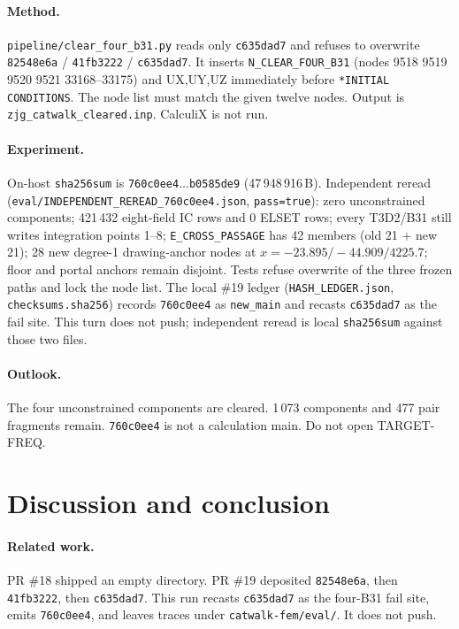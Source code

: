 \documentclass[11pt,a4paper]{article}
\begin{document}
\paragraph{Method.}
\texttt{pipeline/clear\_four\_b31.py} reads only \texttt{c635dad7} and
refuses to overwrite \texttt{82548e6a} / \texttt{41fb3222} /
\texttt{c635dad7}. It inserts \texttt{N\_CLEAR\_FOUR\_B31} (nodes 9518 9519
9520 9521 33168--33175) and UX,UY,UZ immediately before
\texttt{*INITIAL CONDITIONS}. The node list must match the given twelve
nodes. Output is \texttt{zjg\_catwalk\_cleared.inp}. CalculiX is not run.

\paragraph{Experiment.}
On-host \texttt{sha256sum} is
\texttt{760c0ee4\(\ldots\)b0585de9} (47\,948\,916\,B). Independent reread
(\texttt{eval/INDEPENDENT\_REREAD\_760c0ee4.json}, \texttt{pass=true}):
zero unconstrained components; 421\,432 eight-field IC rows and 0 ELSET
rows; every T3D2/B31 still writes integration points 1--8;
\texttt{E\_CROSS\_PASSAGE} has 42 members (old 21 + new 21); 28 new
degree-1 drawing-anchor nodes at \(x=-23.895/-44.909/4225.7\); floor and
portal anchors remain disjoint. Tests refuse overwrite of the three frozen
paths and lock the node list.
The local \#19 ledger (\texttt{HASH\_LEDGER.json},
\texttt{checksums.sha256}) records \texttt{760c0ee4} as \texttt{new\_main}
and recasts \texttt{c635dad7} as the fail site. This turn does not push;
independent reread is local \texttt{sha256sum} against those two files.

\paragraph{Outlook.}
The four unconstrained components are cleared. 1\,073 components and 477
pair fragments remain. \texttt{760c0ee4} is not a calculation main. Do not
open TARGET-FREQ.

\section{Discussion and conclusion}
\label{sec:disc}

\paragraph{Related work.}
PR \#18 shipped an empty directory. PR \#19 deposited \texttt{82548e6a},
then \texttt{41fb3222}, then \texttt{c635dad7}. This run recasts
\texttt{c635dad7} as the four-B31 fail site, emits \texttt{760c0ee4}, and
leaves traces under \texttt{catwalk-fem/eval/}. It does not push.
\end{document}
